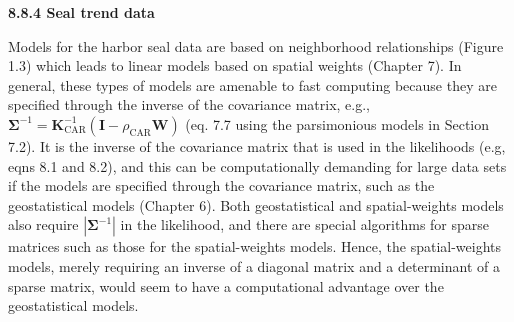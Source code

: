 \documentclass[12pt, titlepage]{article}
\begin{document}
\setcounter{equation}{0}
\renewcommand{\theequation}{R.\arabic{equation}}


%
%

{\large \flushleft \textbf{8.8.4 Seal trend data}}

\vspace{.3cm}

Models for the harbor seal data are based on neighborhood relationships (Figure 1.3) which leads to linear models based on spatial weights (Chapter 7). In general, these types of models are amenable to fast computing because they are specified through the inverse of the covariance matrix, e.g., $\boldsymbol{\Sigma}^{-1} = \mathbf{K}_{\textrm{CAR}}^{-1}(\mathbf{I} - \rho_{\textrm{CAR}}\mathbf{W})$ (eq. 7.7 using the parsimonious models in Section 7.2).  It is the inverse of the covariance matrix that is used in the likelihoods (e.g, eqns 8.1 and 8.2), and this can be computationally demanding for large data sets if the models are specified through the covariance matrix, such as the geostatistical models (Chapter 6).  Both geostatistical and spatial-weights models also require $|\boldsymbol{\Sigma}^{-1}|$ in the likelihood, and there are special algorithms for sparse matrices such as those for the spatial-weights models.  Hence, the spatial-weights models, merely requiring an inverse of a diagonal matrix and a determinant of a sparse matrix, would seem to have a computational advantage over the geostatistical models.
\end{document}
